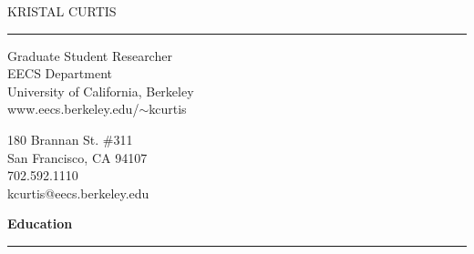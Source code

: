 \documentclass[11pt]{article}
\title{}
\author{}
\date{}
\newcommand{\head}[1]{
{\bf #1} \\
\rule{\textwidth}{0.01 in}

\vspace{-0.35 in}

}
\begin{document}

% 




\begin{center}{\Huge KRISTAL CURTIS} \end{center}
\rule{\textwidth}{0.01 in}

\begin{minipage}{0.5 \textwidth}
\begin{flushleft}
Graduate Student Researcher \\
EECS Department\\
University of California, Berkeley \\
www.eecs.berkeley.edu/$\sim$kcurtis
\ 
\end{flushleft}
\end{minipage}
\begin{minipage}{0.5 \textwidth}
\begin{flushright}
180 Brannan St. \#311 \\
San Francisco, CA 94107 \\
702.592.1110\\
kcurtis@eecs.berkeley.edu\\
\end{flushright}
\end{minipage}
\vspace{0.25 in}


\head{Education}
\end{document}
